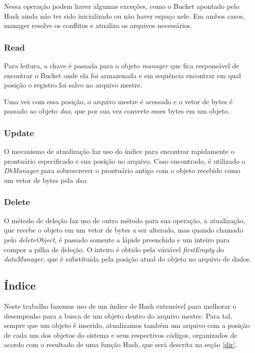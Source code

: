 Nessa operação podem haver algumas exceções, como o Bucket apontado pelo Hash ainda não ter sido inicializado ou não haver espaço nele. Em ambos casos, manager resolve os conflitos e atualiza os arquivos necessários.

\subsubsection{\esp Read}
Para leitura, a chave é passada para o objeto \textit{manager} que fica responsável de encontrar o Bucket onde ela foi armazenada e em sequência encontrar em qual posição o registro foi salvo no arquivo mestre.

Uma vez com essa posição, o arquivo mestre é acessado e o vetor de bytes é passado ao objeto \textit{dao}, que por sua vez converte esses bytes em um objeto.

\subsubsection{\esp Update}
O mecanismo de atualização faz uso do índice para encontrar rapidamente o prontuário especificado e sua posição no arquivo. Caso encontrado, é utilizado o \textit{DbManager} para sobrescrever o prontuário antigo com o objeto recebido como um vetor de bytes pela \textit{dao}.

\subsubsection{\esp Delete}
O método de deleção faz uso de outro método para sua operação, a atualização, que recebe o objeto em um vetor de bytes a ser alterado, mas quando chamado pelo \textit{deleteObject}, é passado somente a lápide preenchida e um inteiro para compor a pilha de deleção. O inteiro é obtido pela váriável \textit{firstEmpty} do \textit{dataManager}, que é substituída pela posição atual do objeto no arquivo de dados.

\subsection{\esp Índice}
Neste trabalho fazemos uso de um índice de Hash extensível para melhorar o desempenho para a busca de um objeto dentro do arquivo mestre. Para tal, sempre que um objeto é inserido, atualizamos também um arquivo com a posição de cada um dos objetos do sistema e seus respectivos códigos, organizados de acordo com o resultado de uma função Hash, que será descrita na seção \ref{dir}.

